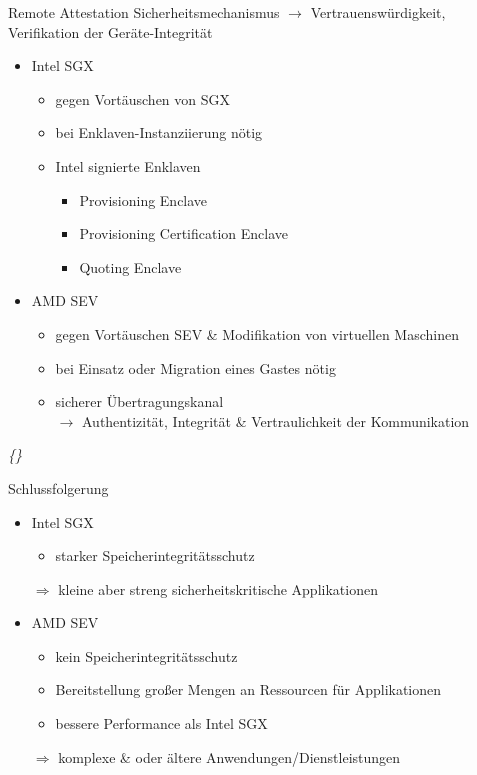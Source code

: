 \documentclass{sdqbeamer}
\begin{document}
\begin{frame}{Remote Attestation}
	Sicherheitsmechanismus \(\rightarrow\) Vertrauenswürdigkeit, Verifikation der Geräte-Integrität
	\begin{itemize}
		\item Intel SGX
		\begin{itemize}
			\item gegen Vortäuschen von SGX
			\item bei Enklaven-Instanziierung nötig
			\item Intel signierte Enklaven
			\begin{itemize}
				\item Provisioning Enclave
				\item Provisioning Certification Enclave
				\item Quoting Enclave 
			\end{itemize}
		\end{itemize}
		\item AMD SEV
		\begin{itemize}
			\item gegen Vortäuschen SEV \& Modifikation von virtuellen Maschinen
			\item bei Einsatz oder Migration eines Gastes nötig
			\item sicherer Übertragungskanal\\
				\(\rightarrow\) Authentizität, Integrität \& Vertraulichkeit der Kommunikation
		\end{itemize}
	\end{itemize}
	\vfill
	\textit{\{\cite{knauth, swami, buhren}\}}
\end{frame}

\begin{frame}{Schlussfolgerung}
	\begin{itemize}
		\item Intel SGX
		\begin{itemize}
			\item starker Speicherintegritätsschutz
		\end{itemize}
			\(\Rightarrow\) kleine aber streng sicherheitskritische Applikationen
		\item AMD SEV
		\begin{itemize}
			\item kein Speicherintegritätsschutz
			\item Bereitstellung großer Mengen an Ressourcen für Applikationen
			\item bessere Performance als Intel SGX
		\end{itemize}
			\(\Rightarrow\) komplexe \& oder ältere Anwendungen/Dienstleistungen
	\end{itemize}
\end{frame}
\end{document}
